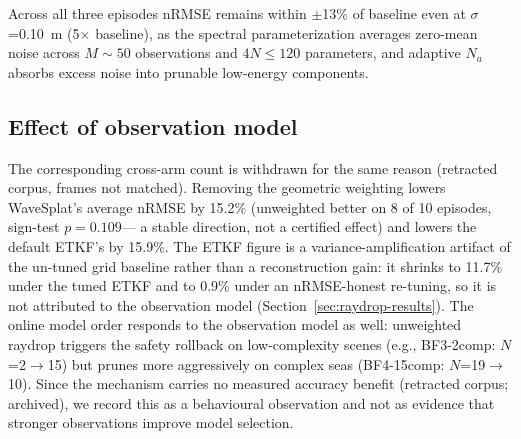 Across all three episodes nRMSE remains within $\pm$13\% of baseline
even at $\sigma$=0.10~m (5$\times$ baseline), as the spectral
parameterization averages zero-mean noise across $M\sim 50$
observations and $4N\leq 120$ parameters, and adaptive $N_a$ absorbs
excess noise into prunable low-energy components.



\subsection{Effect of observation model}

The corresponding cross-arm count is withdrawn for the same reason
(retracted corpus, frames not matched).
Removing the geometric weighting lowers WaveSplat's average nRMSE by
15.2\% (unweighted better on 8 of 10 episodes, sign-test $p=0.109$---%
a stable direction, not a certified effect) and lowers the default
ETKF's by 15.9\%.  The ETKF
figure is a variance-amplification artifact of the un-tuned grid
baseline rather than a reconstruction gain: it shrinks to 11.7\% under
the tuned ETKF and to 0.9\% under an nRMSE-honest re-tuning, so it is
not attributed to the observation model
(Section~\ref{sec:raydrop-results}).
The online model order responds to the observation model as well:
unweighted raydrop triggers the safety rollback on low-complexity scenes
(e.g., BF3-2comp: $N$=2$\to$15) but prunes more aggressively on complex
seas (BF4-15comp: $N$=19$\to$10).  Since the mechanism carries no
measured accuracy benefit (retracted corpus; archived), we record this as
a behavioural observation and not as evidence that stronger observations
improve model selection.


